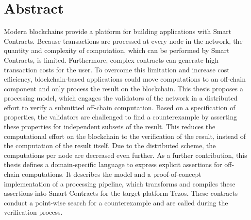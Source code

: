\chapter*{Abstract}
Modern blockchains provide a platform for building applications with Smart Contracts. Because transactions are processed at every node in the network, the quantity and complexity of computation, which can be performed by Smart Contracts, is limited. Furthermore, complex contracts can generate high transaction costs for the user. To overcome this limitation and increase cost efficiency, blockchain-based applications could move computations to an off-chain component and only process the result on the blockchain.
This thesis proposes a processing model, which engages the validators of the network in a distributed effort to verify a submitted off-chain computation. Based on a specification of properties, the validators are challenged to find a counterexample by asserting these properties for independent subsets of the result. This reduces the computational effort on the blockchain to the verification of the result, instead of the computation of the result itself. Due to the distributed scheme, the computations per node are decreased even further. As a further contribution, this thesis defines a domain-specific language to express explicit assertions for off-chain computations. It describes the model and a proof-of-concept implementation of a processing pipeline, which transforms and compiles these assertions into Smart Contracts for the target platform Tezos. These contracts conduct a point-wise search for a counterexample and are called during the verification process.



